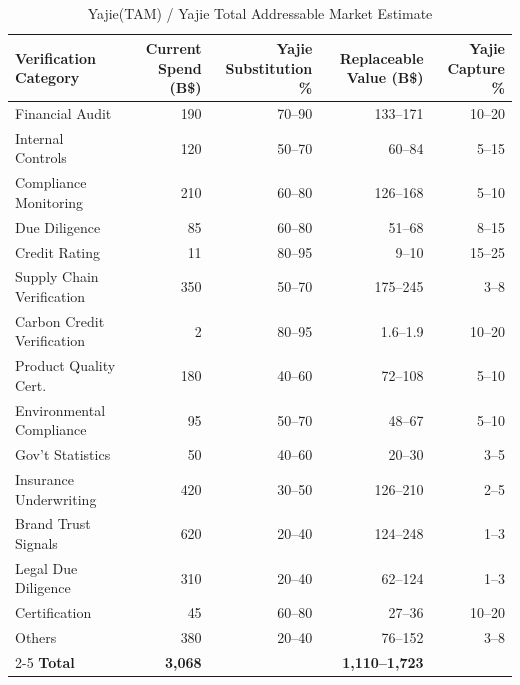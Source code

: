\documentclass[12pt,a4paper]{article}
\theoremstyle{remark}
\begin{document}
\subsection{}
\begin{table}[H]
\centering
\caption{Yajie(TAM) / Yajie Total Addressable Market Estimate}
\label{tab:tam}
\small
\begin{tabular}{@{}p{3.5cm} r r r r@{}}
\toprule
\textbf{ Verification Category} & \textbf{ Current Spend (B\$)} & \textbf{Yajie Substitution \%} & \textbf{ Replaceable Value (B\$)} & \textbf{Yajie Capture \%} \\
\midrule
 Financial Audit & 190 & 70--90 & 133--171 & 10--20 \\
 Internal Controls & 120 & 50--70 & 60--84 & 5--15 \\
 Compliance Monitoring & 210 & 60--80 & 126--168 & 5--10 \\
 Due Diligence & 85 & 60--80 & 51--68 & 8--15 \\
 Credit Rating & 11 & 80--95 & 9--10 & 15--25 \\
 Supply Chain Verification & 350 & 50--70 & 175--245 & 3--8 \\
 Carbon Credit Verification & 2 & 80--95 & 1.6--1.9 & 10--20 \\
 Product Quality Cert. & 180 & 40--60 & 72--108 & 5--10 \\
 Environmental Compliance & 95 & 50--70 & 48--67 & 5--10 \\
 Gov't Statistics & 50 & 40--60 & 20--30 & 3--5 \\
 Insurance Underwriting & 420 & 30--50 & 126--210 & 2--5 \\
 Brand Trust Signals & 620 & 20--40 & 124--248 & 1--3 \\
 Legal Due Diligence & 310 & 20--40 & 62--124 & 1--3 \\
 Certification & 45 & 60--80 & 27--36 & 10--20 \\
 Others & 380 & 20--40 & 76--152 & 3--8 \\
\cmidrule{2-5}
\textbf{ Total} & \textbf{3,068} & & \textbf{1,110--1,723} & \\
\bottomrule
\end{tabular}
\end{table}
\end{document}
